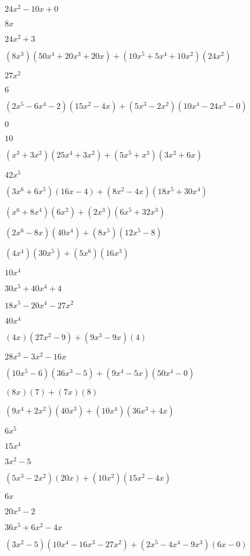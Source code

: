 \documentclass{article}
\begin{document}
\begin{multicols}{2}
$24x^{2}-10x+0$\item $8x$\item $24x^{2}+3$\item $(8x^{3})(50x^{4}+20x^{3}+20x)+(10x^{5}+5x^{4}+10x^2)(24x^{2})$\item $27x^{2}$\item $6$\item $(2x^{5}-6x^{4}-2)(15x^{2}-4x)+(5x^{3}-2x^2)(10x^{4}-24x^{3}-0)$\item $0$\item $10$\item $(x^{3}+3x^2)(25x^{4}+3x^{2})+(5x^{5}+x^{3})(3x^{2}+6x)$\item $42x^{5}$\item $(3x^{6}+6x^{5})(16x-4)+(8x^2-4x)(18x^{5}+30x^{4})$\item $(x^{6}+8x^{4})(6x^{2})+(2x^{3})(6x^{5}+32x^{3})$\item $(2x^{6}-8x)(40x^{4})+(8x^{5})(12x^{5}-8)$\item $(4x^{4})(30x^{5})+(5x^{6})(16x^{3})$\item $10x^{4}$\item $30x^{5}+40x^{4}+4$\item $18x^{5}-20x^{4}-27x^{2}$\item $40x^{4}$\item $(4x)(27x^{2}-9)+(9x^{3}-9x)(4)$\item $28x^{3}-3x^{2}-16x$\item $(10x^{5}-6)(36x^{3}-5)+(9x^{4}-5x)(50x^{4}-0)$\item $(8x)(7)+(7x)(8)$\item $(9x^{4}+2x^2)(40x^{3})+(10x^{4})(36x^{3}+4x)$\item $6x^{5}$\item $15x^{4}$\item $3x^{2}-5$\item $(5x^{3}-2x^2)(20x)+(10x^2)(15x^{2}-4x)$\item $6x$\item $20x^{3}-2$\item $36x^{5}+6x^{2}-4x$\item $(3x^2-5)(10x^{4}-16x^{3}-27x^{2})+(2x^{5}-4x^{4}-9x^{3})(6x-0)$\item 
\end{multicols}
\end{document}
